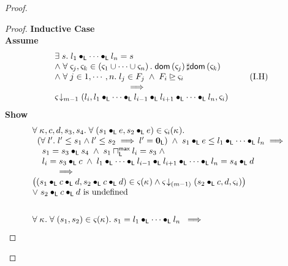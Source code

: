 \begin{lemma}[]
\begin{proof}
\begin{proof}
\noindent\textbf{Inductive Case}\\
\textbf{Assume}
\begin{align}
	\begin{array}{l }
		\exsts{s} l_1 \composeL  \cdots \composeL l_n = s \\
	  \land\; \for{\amod{j}, \amod{k} \in \left(\amod{1} \cup \cdots \cup \amod{n}\right)} \dom{\amod{j}} \disjoint \dom{\amod{k}} \\
	  \land\; \for{j \in 1, \cdots, n} l_j \in F_j  \;\land\; F_i \strictfences \amod{i} \\
	  \hspace*{3cm} \implies\\
	  \extendsAMUpto{\amod{}}{m-1}{l_i}{l_1 \composeL \cdots \composeL l_{i-1} \composeL l_{i+1} \composeL \cdots \composeL l_n}{\amod{i}}
	\end{array} \tag{I.H} \label{LAW:I.H}
\end{align}
\textbf{Show } 
\begin{align}
	&\begin{array}{l}
		\forall\; \kappa_{}, c, d, s_3, s_4.\;\forall\; (s_1 \bullet_{\textsf{L}} e, s_2 \bullet_{\textsf{L}} e) \in \varsigma_{i}(\kappa_{}).\; \\
	\hspace*{0.2cm}\left(\forall\; l'.\; l' \leq s_1 \land l' \leq s_2 \implies l' = \mathbf{0}_{\textsf{L}}\right) \;\land\; s_1 \bullet_{\textsf{L}} e \leq  l_1 \bullet_{\textsf{L}} \cdots \bullet_{\textsf{L}} l_n \implies\\
	\hspace*{0.4cm} s_1 = s_3 \bullet_{\textsf{L}} s_4 \;\land\; s_1 \sqcap_{\textsf{L}}^{\textsf{max}} l_i = s_3 \;\land\\
	\hspace*{0.4cm} l_i = s_3 \bullet_{\textsf{L}} c \;\land\; l_1 \bullet_{\textsf{L}} \cdots \bullet_{\textsf{L}} l_{i-1} \bullet_{\textsf{L}} l_{i+1} \bullet_{\textsf{L}} \cdots \bullet_{\textsf{L}} l_n = s_4 \bullet_{\textsf{L}} d \\
	\hspace*{1cm}\implies\\
	\left((s_1 \bullet_{\textsf{L}} c \bullet_{\textsf{L}} d, s_2 \bullet_{\textsf{L}} c \bullet_{\textsf{L}} d) \in \varsigma_{}(\kappa_{}) \land
	\varsigma_{} \!\downarrow_{(m-1)} \left(s_2 \bullet_{\textsf{L}} c, d, \varsigma_{i}\right)\right)\\
	\lor\; s_2 \bullet_{\textsf{L}} c \bullet_{\textsf{L}} d \text{ is undefined}
	\end{array} \label{LAW:Goal1} \\\nonumber\\
	&\begin{array}{l}
		\forall\; \kappa_{}.\; \forall\; (s_1, s_2) \in \varsigma_{}(\kappa_{}).\; s_1 = l_1 \bullet_{\textsf{L}} \cdots \bullet_{\textsf{L}} l_n \;\implies\\

\end{array}
\end{align}
\end{proof}
\end{proof}
\end{lemma}
